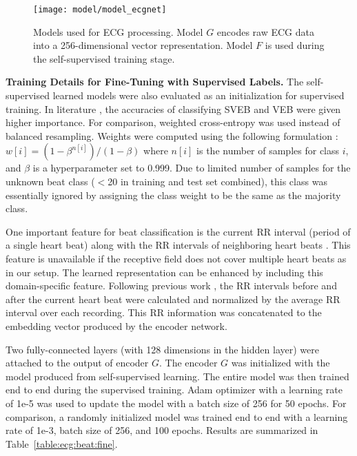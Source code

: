 \documentclass{article}
\renewcommand{\paragraph}[1]{\textbf{#1}\hspace{1em}}
\begin{document}
\begin{figure}[H]
  \centering
  \texttt{[image: model/model\_ecgnet]}
  \caption{Models used for ECG processing. Model $G$ encodes raw ECG data into a
  256-dimensional vector representation. Model $F$ is used during the
  self-supervised training stage.}
  \label{fig:model:ecg}
\end{figure}


\paragraph{Training Details for Fine-Tuning with Supervised Labels.}
The self-supervised learned models were also evaluated as an initialization for
supervised training. In literature
\cite{de_chazal_automatic_2004,huang_new_2014,garcia_inter-patient_2017,xu_towards_2019,niu_inter-patient_2019},
the accuracies of classifying SVEB and VEB were given higher importance. For
comparison, weighted cross-entropy was used \cite{niu_inter-patient_2019}
instead of balanced resampling. Weights were computed using the following
formulation \cite{cui_class-balanced_2019}: $w[i] = (1-\beta^{n[i]})/(1-\beta)$
where $n[i]$ is the number of samples for class $i$, and $\beta$ is a
hyperparameter set to 0.999. Due to limited number of samples for the unknown
beat class ($<$20 in training and test set combined), this class was essentially
ignored by assigning the class weight to be the same as the majority class.

One important feature for beat classification is the current RR interval (period
of a single heart beat) along with the RR intervals of neighboring heart beats
\cite{doquire_feature_2011,lin_heartbeat_2014}. This feature is unavailable if
the receptive field does not cover multiple heart beats as in our setup. The
learned representation can be enhanced by including this domain-specific
feature. Following previous work \cite{huang_new_2014,niu_inter-patient_2019},
the RR intervals before and after the current heart beat were calculated and
normalized by the average RR interval over each recording. This RR information
was concatenated to the embedding vector produced by the encoder network.

Two fully-connected layers (with 128 dimensions in the hidden layer) were
attached to the output of encoder $G$. The encoder $G$ was initialized with the
model produced from self-supervised learning. The entire model was then trained
end to end during the supervised training. Adam optimizer with a learning rate
of 1e-5 was used to update the model with a batch size of 256 for 50 epochs. For
comparison, a randomly initialized model was trained end to end with a learning
rate of 1e-3, batch size of 256, and 100 epochs. Results are summarized in
Table~\ref{table:ecg:beat:fine}.
\end{document}
